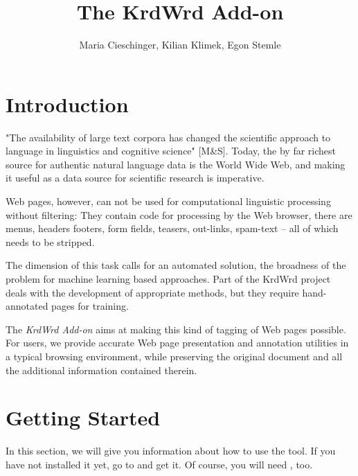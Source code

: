 \documentclass[12pt]{article}
\title{The KrdWrd Add-on}
\author{Maria Cieschinger, Kilian Klimek, Egon Stemle}
\begin{document}
\maketitle

\section{Introduction}


"The availability of large text corpora has changed the scientific approach to language in linguistics and cognitive science" [M\&S].
Today, the by far richest source for authentic natural language data is the World Wide Web, and making it useful as a data source for scientific research is imperative.

Web pages, however, can not be used for computational linguistic processing without filtering:
They contain code for processing by the Web browser, there are menus, headers footers, form fields, teasers, out-links, spam-text -- all of which needs to be stripped.

The dimension of this task calls for an automated solution, the broadness of the problem for machine learning based approaches.
Part of the KrdWrd project deals with the development of appropriate methods, but they require hand-annotated pages for training.

The \textit{KrdWrd Add-on} aims at making this kind of tagging of Web pages possible.
For users, we provide accurate Web page presentation and annotation utilities in a typical browsing environment, while preserving the original document and all the additional information contained therein.


\section{Getting Started}
In this section, we will give you information about how to use the tool. If you have not installed it yet, go to  and get it. Of course, you will need , too. \\
\end{document}
